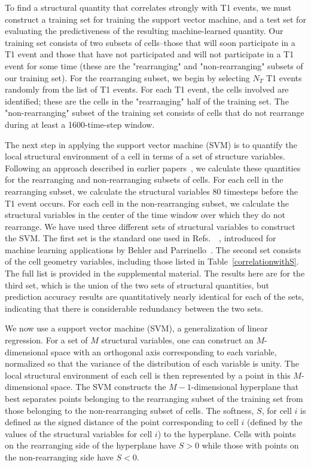 \documentclass[twoside,twocolumn,9pt]{article}
\begin{document}
To find a structural quantity that correlates strongly with T1 events, we must construct a training set for training the support vector machine, and a test set for evaluating the predictiveness of the resulting machine-learned quantity. Our training set consists of two subsets of cells--those that will soon participate in a T1 event and those that have not participated and will not participate in a T1 event for some time (these are the "rearranging" and "non-rearranging" subsets of our training set). For the rearranging subset, we begin by selecting $N_T$ T1 events randomly from the list of T1 events.  %
For each T1 event, the cells involved are identified; these are the cells in the "rearranging" half of the training set. The "non-rearranging" subset of the training set consists of cells that do not rearrange during at least a 1600-time-step window. 

The next step in applying the support vector machine (SVM) is to quantify the local structural environment of a cell in terms of a set of structure variables. Following an approach described in earlier papers~\cite{schoenholz2016a,cubuk2017}, we calculate these quantities for the rearranging and non-rearranging subsets of cells. For each cell in the rearranging subset, we calculate the structural variables 80 timesteps before the T1 event occurs. For each cell in the non-rearranging subset, we calculate the structural variables in the center of the time window over which they do not rearrange. We have used three different sets of structural variables to construct the SVM. The first set is the standard one used in Refs.~~\cite{cubuk2015,schoenholz2016a,cubuk2016,schoenholz2016b,cubuk2017,sussman2017,sharp2018,landes2019}, introduced for machine learning applications by Behler and Parrinello~\cite{BehlerParinello2007}. The second set consists of the cell geometry variables, including those listed in Table~\ref{correlationwithS}. The full list is provided in the supplemental material. The results here are for the third set, which is the union of the two sets of structural quantities, but prediction accuracy results are quantitatively nearly identical for each of the sets, indicating that there is considerable redundancy between the two sets.

We now use a support vector machine (SVM), a generalization of linear regression. For a set of $M$ structural variables, one can construct an $M$-dimensional space with an orthogonal axis corresponding to each variable, normalized so that the variance of the distribution of each variable is unity. The local structural environment of each cell is then represented by a point in this $M$-dimensional space. The SVM constructs the $M-1$-dimensional hyperplane that best separates points belonging to the rearranging subset of the training set from those belonging to the non-rearranging subset of cells. The softness, $S$, for cell $i$ is defined as the signed distance of the point corresponding to cell $i$ (defined by the values of the structural variables for cell $i$) to the hyperplane. Cells with points on the rearranging side of the hyperplane have $S>0$ while those with points on the non-rearranging side have $S<0$.
\end{document}
